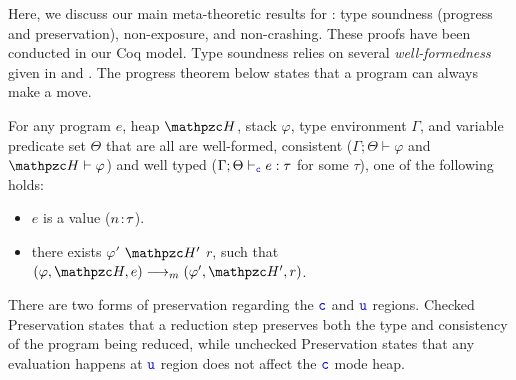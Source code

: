 
Here, we discuss our main meta-theoretic results for
\systemname: type soundness (progress and preservation),
non-exposure, and non-crashing.
These proofs have been conducted in our Coq model.
Type soundness relies on several \emph{well-formedness} given in \cite{li22checkedc} and .
The progress theorem below states that a \systemname program can always make a move.

\begin{thm}[Progress]\label{thm:progress}

For any \systemname program $e$, heap $\heap$, stack
$\varphi$, type environment $\Gamma$, and variable predicate set $\Theta$
that are all are well-formed, consistent
($\Gamma;\Theta\vdash \varphi$ and $\heap \vdash \varphi$) and well
typed ($\Gamma;\Theta\vdash_{\textcolor{blue}{\texttt{c}}} e : \tau$ for some $\tau$),
one of the following holds:

\begin{itemize}

\item $e$ is a value (${n}\!:\!{\tau}$).

\item there exists $\varphi'$ $\heap'$ $r$, such that $(\varphi,\heap,e) \longrightarrow_m (\varphi',\heap',r)$.

\end{itemize}
\end{thm}

\noindent
There are two forms of preservation regarding the $\textcolor{blue}{\texttt{c}}$ and $\textcolor{blue}{\texttt{u}}$ regions.
Checked Preservation states that a reduction step preserves both the
type and consistency of the program being reduced, while
unchecked Preservation states that any evaluation happens at $\textcolor{blue}{\texttt{u}}$ region does not affect the $\textcolor{blue}{\texttt{c}}$ mode heap.

